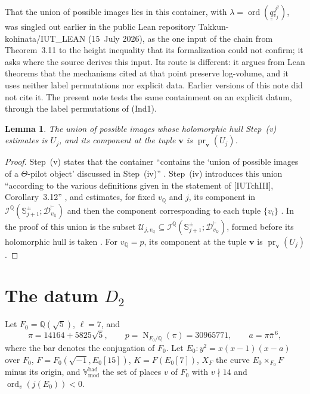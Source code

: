\documentclass[11pt]{amsart}
\newtheorem{lemma}[theorem]{Lemma}
\theoremstyle{remark}
\newcommand{\Q}{\mathbb Q}
\newcommand{\cI}{\mathcal I}
\newcommand{\cU}{\mathcal U}
\newcommand{\qq}{\underline{\underline{q}}{}}
\newcommand{\Vbadmod}{\mathbb V^{\mathrm{bad}}_{\mathrm{mod}}}
\newcommand{\pr}{\operatorname{pr}}
\newcommand{\Nm}{\operatorname{N}}
\newcommand{\Sj}{\mathbb S^{\pm}_{j+1}}
\newcommand{\bv}{\mathbf v}
\begin{document}
That the union of possible images lies in this container, with $\lambda=\operatorname{ord}(\qq_{v_j}^{\,j^2})$,
was singled out earlier in the public Lean repository Takkun-kohinata/IUT\_LEAN \cite{Takkun} (15~July 2026), as
the one input of the chain from Theorem~3.11 to the height inequality that its formalization could not confirm; it
asks where the source derives this input. Its route is different: it argues from Lean theorems that the
mechanisms cited at that point preserve log-volume, and it uses neither label permutations nor explicit data.
Earlier versions of this note did not cite it. The present note tests the same containment on an explicit datum,
through the label permutations of (Ind1).

\begin{lemma}\label{l:object}
The union of possible images whose holomorphic hull Step~(v) estimates is $U_j$, and its component at the
tuple $\bv$ is $\pr_{\bv}(U_j)$.
\end{lemma}

\begin{proof}
Step~(v) states that the container ``contains the `union of possible images of a $\Theta$-pilot object'
discussed in Step~(iv)'' \cite[p.~27]{IUT4}. Step~(iv) introduces this union ``according to the various
definitions given in the statement of [IUTchIII], Corollary~3.12'' \cite[p.~26]{IUT4}, and estimates, for fixed
$v_{\Q}$ and $j$, its component in $\cI^{\Q}(\Sj;\mathcal D^{\vdash}_{v_{\Q}})$ and then the component
corresponding to each tuple $\{v_i\}$ \cite[p.~27]{IUT4}. In the proof of \cite[Cor.~3.12]{IUT3} this union is the
subset $\cU_{j,v_{\Q}}\subseteq\cI^{\Q}(\Sj;\mathcal D^{\vdash}_{v_{\Q}})$, formed before its holomorphic hull is
taken \cite[p.~174]{IUT3}. For $v_{\Q}=p$, its component at the tuple $\bv$ is $\pr_{\bv}(U_j)$.
\end{proof}

\section{The datum \texorpdfstring{$D_2$}{D2}}\label{s:datum}

Let $F_0=\Q(\sqrt5)$, $\ell=7$, and
\[
\pi=14164+5825\sqrt5,\qquad p=\Nm_{F_0/\Q}(\pi)=30965771,\qquad a=\pi\bar\pi^{\,6},
\]
where the bar denotes the conjugation of $F_0$. Let $E_0\colon y^2=x(x-1)(x-a)$ over $F_0$,
$F=F_0(\sqrt{-1},E_0[15])$, $K=F(E_0[7])$, $X_F$ the curve $E_0\times_{F_0}F$ minus its origin, and $\Vbadmod$ the
set of places $v$ of $F_0$ with $v\nmid 14$ and $\operatorname{ord}_v(j(E_0))<0$.
\end{document}
